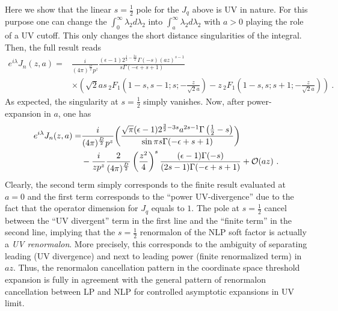\documentclass[a4paper,11pt]{article}
\begin{document}
Here we show that the linear $s=\frac{1}{2}$ pole for the $J_q$ above is UV in nature. For this purpose one can change the $\int_{0}^{\infty} \lambda_2 d\lambda_2$ into $\int_{a}^{\infty} \lambda_2 d\lambda_2$ with $a>0$ playing the role of a UV cutoff. This only changes the short distance singularities of the integral. Then, the full result reads
\begin{align}
e^{i\lambda}J_n(z,a)=&\frac{i}{(4\pi)^{\frac{D}{2}}p^z}\frac{(\epsilon-1) 2^{\frac{1}{2}-\frac{3 s}{2}} \Gamma (-s) (a z)^{s-1} }{s \Gamma (-\epsilon+s+1)} \nonumber \\ 
& \times \left(\sqrt{2} a s \, _2F_1\left(1-s,s-1;s;-\frac{z}{\sqrt{2} a}\right)-z \, _2F_1\left(1-s,s;s+1;-\frac{z}{\sqrt{2} a}\right)\right) \ .
\end{align}
As expected, the singularity at $s=\frac{1}{2}$ simply vanishes. Now, after power-expansion in $a$, one has
\begin{align}
e^{i\lambda}J_n(z,a)=&\frac{i}{(4\pi)^{\frac{D}{2}}p^z} \bigg(\frac{\sqrt{\pi } (\epsilon-1) 2^{\frac{3}{2}-3 s} a^{2 s-1}  \Gamma \left(\frac{1}{2}-s\right)}{\sin \pi s\Gamma (-\epsilon+s+1)}\bigg) %
\nonumber \\ 
&-\frac{i}{zp^z}\frac{2}{(4\pi)^{\frac{D}{2}}}\left(\frac{z^2}{4}\right)^s\frac{(\epsilon-1)\Gamma (-s)}{(2 s-1) \Gamma (-\epsilon+s+1)}+{\cal O}(az) \ .
\end{align}
Clearly, the second term simply corresponds to the finite result evaluated at $a=0$ and the first term corresponds to the ``power UV-divergence'' due to the fact that the operator dimension for $J_q$ equals to $1$. The pole at $s=\frac{1}{2}$ cancel between the ``UV divergent'' term in the first line and the ``finite term'' in the second line, implying that the $s=\frac{1}{2}$ renormalon of the NLP soft factor is actually a {\it UV renormalon}. More precisely, this corresponds to the ambiguity of separating leading (UV divergence) and next to leading power (finite renormalized term) in $az$.   Thus, the renormalon cancellation pattern in the coordinate space threshold expansion is fully in agreement with the general pattern of renormalon cancellation between LP and NLP for controlled asymptotic expansions in UV limit.  
\end{document}
